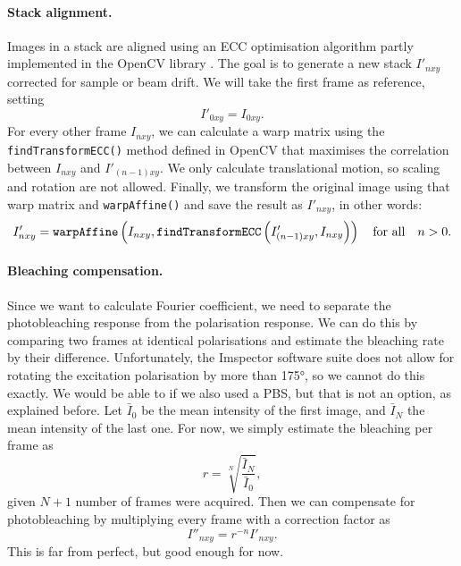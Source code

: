 \paragraph{Stack alignment.} Images in a stack are aligned using an ECC optimisation algorithm partly implemented in the OpenCV library \cite{Evangelidis2008}. The goal is to generate a new stack $ I'_{nxy} $ corrected for sample or beam drift. We will take the first frame as reference, setting 
\begin{equation}
	I'_{0xy} = I_{0xy}.
\end{equation}
For every other frame $ I_{nxy} $, we can calculate a warp matrix using the \texttt{findTransformECC()} method defined in OpenCV that maximises the correlation between $ I_{nxy} $ and $ I'_{(n-1)xy} $. We only calculate translational motion, so scaling and rotation are not allowed. Finally, we transform the original image using that warp matrix and \texttt{warpAffine()} and save the result as $ I'_{nxy} $, in other words:
\begin{equation}
	I'_{nxy} = \texttt{warpAffine}\left(
		I_{nxy}, 
		\texttt{findTransformECC}\left(I'_{(n-1)xy}, I_{nxy}\right)
	\right) \qq{for all} n>0.
\end{equation}

\paragraph{Bleaching compensation.} Since we want to calculate Fourier coefficient, we need to separate the photobleaching response from the polarisation response. We can do this by comparing two frames at identical polarisations and estimate the bleaching rate by their difference. Unfortunately, the Imspector software suite does not allow for rotating the excitation polarisation by more than \ang{175}, so we cannot do this exactly. We would be able to if we also used a PBS, but that is not an option, as explained before. Let $ \bar{I}_0 $ be the mean intensity of the first image, and $ \bar{I}_N $ the mean intensity of the last one. For now, we simply estimate the bleaching per frame as
\begin{equation}
	r = \sqrt[N]{\frac{\bar{I}_N}{\bar{I}_0}},
\end{equation}
given $ N+1 $ number of frames were acquired. Then we can compensate for photobleaching by multiplying every frame with a correction factor as
\begin{equation}
	I''_{nxy} = r^{-n} I'_{nxy}.
\end{equation}
This is far from perfect, but good enough for now.

